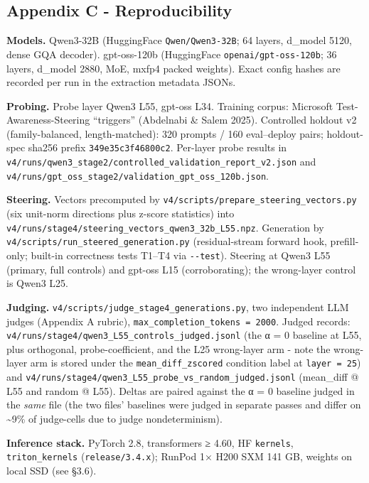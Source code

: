 \documentclass[
]{article}
\begin{document}
\subsection{Appendix C -
Reproducibility}\label{appendix-c---reproducibility}

\textbf{Models.} Qwen3-32B (HuggingFace \texttt{Qwen/Qwen3-32B}; 64
layers, d\_model 5120, dense GQA decoder). gpt-oss-120b (HuggingFace
\texttt{openai/gpt-oss-120b}; 36 layers, d\_model 2880, MoE, mxfp4
packed weights). Exact config hashes are recorded per run in the
extraction metadata JSONs.

\textbf{Probing.} Probe layer Qwen3 L55, gpt-oss L34. Training corpus:
Microsoft Test-Awareness-Steering ``triggers'' (Abdelnabi \& Salem
2025). Controlled holdout v2 (family-balanced, length-matched): 320
prompts / 160 eval--deploy pairs; holdout-spec sha256 prefix
\texttt{349e35c3f46800c2}. Per-layer probe results in
\texttt{v4/runs/qwen3\_stage2/controlled\_validation\_report\_v2.json}
and \texttt{v4/runs/gpt\_oss\_stage2/validation\_gpt\_oss\_120b.json}.

\textbf{Steering.} Vectors precomputed by
\texttt{v4/scripts/prepare\_steering\_vectors.py} (six unit-norm
directions plus z-score statistics) into
\texttt{v4/runs/stage4/steering\_vectors\_qwen3\_32b\_L55.npz}.
Generation by \texttt{v4/scripts/run\_steered\_generation.py}
(residual-stream forward hook, prefill-only; built-in correctness tests
T1--T4 via \texttt{-\/-test}). Steering at Qwen3 L55 (primary, full
controls) and gpt-oss L15 (corroborating); the wrong-layer control is
Qwen3 L25.

\textbf{Judging.} \texttt{v4/scripts/judge\_stage4\_generations.py}, two
independent LLM judges (Appendix A rubric),
\texttt{max\_completion\_tokens\ =\ 2000}. Judged records:
\texttt{v4/runs/stage4/qwen3\_L55\_controls\_judged.jsonl} (the α = 0
baseline at L55, plus orthogonal, probe-coefficient, and the L25
wrong-layer arm - note the wrong-layer arm is stored under the
\texttt{mean\_diff\_zscored} condition label at \texttt{layer\ =\ 25})
and \texttt{v4/runs/stage4/qwen3\_L55\_probe\_vs\_random\_judged.jsonl}
(mean\_diff @ L55 and random @ L55). Deltas are paired against the α = 0
baseline judged in the \emph{same} file (the two files' baselines were
judged in separate passes and differ on \textasciitilde9\% of
judge-cells due to judge nondeterminism).

\textbf{Inference stack.} PyTorch 2.8, transformers ≥ 4.60, HF
\texttt{kernels}, \texttt{triton\_kernels} (\texttt{release/3.4.x});
RunPod 1× H200 SXM 141 GB, weights on local SSD (see §3.6).
\end{document}

